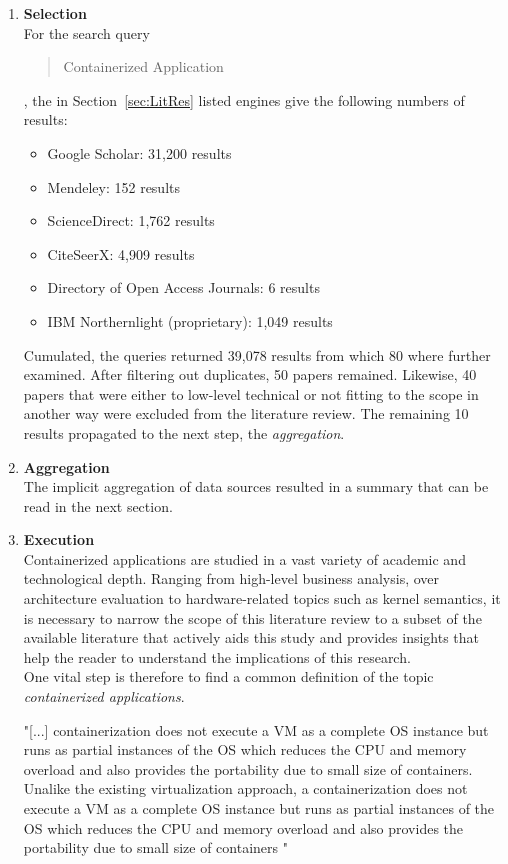 \begin{enumerate}
    \item
    \textbf{Selection}\\
    For the search query \blockquote{Containerized Application}, the in Section~\vref{sec:LitRes} listed engines give the following numbers of results:
    
    \begin{itemize}[nolistsep]
        \renewcommand\labelitemi{--}
        \item Google Scholar: 31,200 results
        \item Mendeley: 152 results
        \item ScienceDirect: 1,762 results
        \item CiteSeerX: 4,909 results
        \item Directory of Open Access Journals: 6 results
        \item IBM Northernlight (proprietary): 1,049 results
    \end{itemize}
    
    Cumulated, the queries returned 39,078 results from which 80 where further examined. After filtering out duplicates, 50 papers remained. Likewise, 40 papers that were either to low-level technical or not fitting to the scope in another way were excluded from the literature review. The remaining 10 results propagated to the next step, the \textit{aggregation}.
    
    \item
    \textbf{Aggregation}\\
    The implicit aggregation of data sources resulted in a summary that can be read in the next section.
    
    \item
    \textbf{Execution}\\
    
    Containerized applications are studied in a vast variety of academic and technological depth. Ranging from high-level business analysis, over architecture evaluation to hardware-related topics such as kernel semantics, it is necessary to narrow the scope of this literature review to a subset of the available literature that actively aids this study and provides insights that help the reader to understand the implications of this research.\\
    One vital step is therefore to find a common definition of the topic \textit{containerized applications}.
    
    \begin{displayquote}
        "[...] containerization does not execute a
        VM as a complete OS instance but runs as partial instances
        of the OS which reduces the CPU and memory overload and
        also provides the portability due to small size of containers.
        Unalike the existing
        virtualization approach, a containerization does not execute a
        VM as a complete OS instance but runs as partial instances
        of the OS which reduces the CPU and memory overload and
        also provides the portability due to small size of containers
        "\autocite{Kumar2017EconomicallyContainers}
    \end{displayquote}
       

\end{enumerate}
